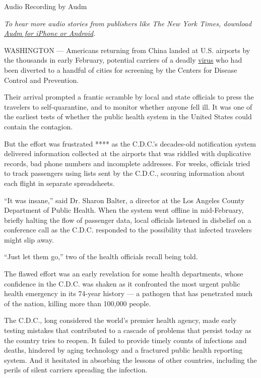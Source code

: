 Audio Recording by Audm

\emph{To hear more audio stories from publishers like The New York
Times, download}
\href{https://www.audm.com/?utm_source=nyt\&utm_medium=embed\&utm_campaign=cdc_existence_wrong}{\emph{Audm
for iPhone or Android}}\emph{.}

WASHINGTON --- Americans returning from China landed at U.S. airports by
the thousands in early February, potential carriers of a deadly
\href{https://www.nytimes3xbfgragh.onion/2020/06/15/health/coronavirus-underlying-conditions.html}{virus}
who had been diverted to a handful of cities for screening by the
Centers for Disease Control and Prevention.

Their arrival prompted a frantic scramble by local and state officials
to press the travelers to self-quarantine, and to monitor whether anyone
fell ill. It was one of the earliest tests of whether the public health
system in the United States could contain the contagion.

But the effort was frustrated **** as the C.D.C.'s decades-old
notification system delivered information collected at the airports that
was riddled with duplicative records, bad phone numbers and incomplete
addresses. For weeks, officials tried to track passengers using lists
sent by the C.D.C., scouring information about each flight in separate
spreadsheets.

``It was insane,'' said Dr. Sharon Balter, a director at the Los Angeles
County Department of Public Health. When the system went offline in
mid-February, briefly halting the flow of passenger data, local
officials listened in disbelief on a conference call as the C.D.C.
responded to the possibility that infected travelers might slip away.

``Just let them go,'' two of the health officials recall being told.

The flawed effort was an early revelation for some health departments,
whose confidence in the C.D.C. was shaken as it confronted the most
urgent public health emergency in its 74-year history --- a pathogen
that has penetrated much of the nation, killing more than 100,000
people.

The C.D.C., long considered the world's premier health agency, made
early testing mistakes that contributed to a cascade of problems that
persist today as the country tries to reopen. It failed to provide
timely counts of infections and deaths, hindered by aging technology and
a fractured public health reporting system. And it hesitated in
absorbing the lessons of other countries, including the perils of silent
carriers spreading the infection.

